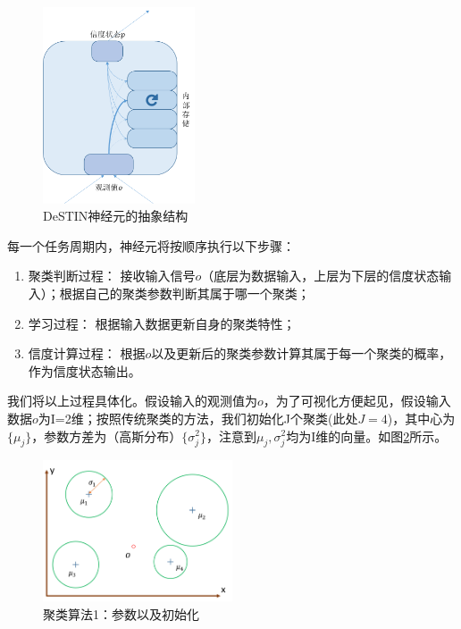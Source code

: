 \begin{figure}[htbp]
   \centering
   \includegraphics[width=0.4\textwidth]{NeuronStructure.png} %
   \caption{DeSTIN神经元的抽象结构}
   \label{fig:neuronstr}
\end{figure}

每一个任务周期内，神经元将按顺序执行以下步骤：
\begin{enumerate}
\item 聚类判断过程： 接收输入信号$o$（底层为数据输入，上层为下层的信度状态输入）；根据自己的聚类参数判断其属于哪一个聚类；
\item 学习过程： 根据输入数据更新自身的聚类特性；
\item 信度计算过程： 根据$o$以及更新后的聚类参数计算其属于每一个聚类的概率，作为信度状态输出。
\end{enumerate}

我们将以上过程具体化。假设输入的观测值为$o$，为了可视化方便起见，假设输入数据$o$为I=2维；按照传统聚类的方法，我们初始化J个聚类(此处$J=4$)，其中心为$\{\mu_j\}$，参数方差为（高斯分布）$\{\sigma^2_j\}$，注意到$\mu_j, \sigma^2_j$均为I维的向量。如图\ref{fig:onlineclus1}所示。

\begin{figure}[htbp]
   \centering
   \includegraphics[width=0.5\textwidth]{OnlineClustering1.png} %
   \caption{聚类算法1：参数以及初始化}
   \label{fig:onlineclus1}
\end{figure}

